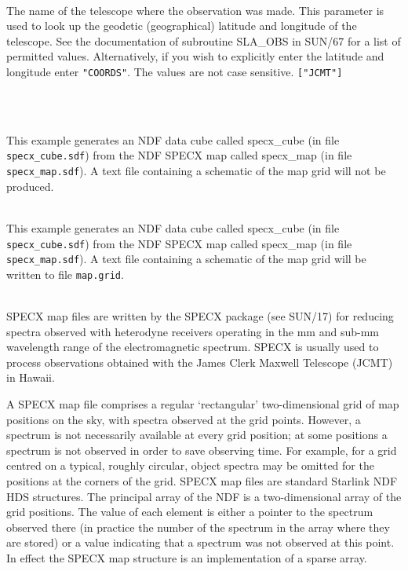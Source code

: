 \documentclass[twoside,11pt]{article}
\newcommand{\htmladdnormallink}[2]{#1}
\newcommand{\htmlref}[2]{#1}
\newcommand{\xref}[3]{#1}
\newlength{\sstexampleslength}
\newcommand{\sstexamples}[1]{
   \goodbreak
   \item[Examples:] \mbox{} \\
   \vspace{-3.5ex}
   \begin{description}
      #1
   \end{description}
}
\newcommand{\sstsubsection}[1]{ \item[{#1}] \mbox{} \\}
\newcommand{\sstexamplesubsection}[2]{\sloppy
\item[\parbox{\sstexampleslength}{\ssttt #1}] \mbox{} \vspace{0.5ex}
\\ #2 \vspace{1.0ex}}
\newcommand{\sstdiytopic}[2]{\goodbreak \item[{\hspace{-0.35em}#1\hspace{-0.35em}:}] \mbox{} \\[1.3ex] #2}
\newcommand{\sstexamples}[1]{
   \item[\vspace{0.35ex}\htmlref{Examples:\vspace{-0.5ex}}{app_example}]
      \begin{description}
         #1
      \end{description}
      \\
   }
\newcommand{\sstsubsection}[1]{\item[{#1}]}
\newcommand{\sstexamplesubsection}[2]{
   \vspace{-1.0ex} \item[{\ssttt #1}] #2 \vspace{0.2ex}}
\newcommand{\sstdiytopic}[2]{\\ \item[{#1}:]
      \begin{description}
         #2
      \end{description}
   }
\begin{document}
{{{      }
      \sstsubsection{
         TELESCOPE  =  LITERAL (Read)
      }{
         The name of the telescope where the observation was made.
         This parameter is used to look up the geodetic (geographical)
         latitude and longitude of the telescope.  See the documentation
         of subroutine SLA\_OBS in 
         \xref{SUN/67}{sun67}{} for a list of permitted values.
         Alternatively, if you wish to explicitly enter the latitude and
         longitude enter \texttt{"COORDS"}.  The values are not case sensitive.
         \texttt{["JCMT"]}
      }
   }
   \sstexamples{
      \sstexamplesubsection{
         specx2ndf  specx\_map  specx\_cube
      }{
         This example generates an NDF data cube called specx\_cube
         (in file \texttt{specx\_cube.sdf}) from the NDF SPECX map called
         specx\_map (in file \texttt{specx\_map.sdf}).  A text file
         containing a schematic of the map grid will not be produced.
      }
      \sstexamplesubsection{
         specx2ndf  specx\_map  specx\_cube  gridfile=map.grid
      }{
         This example generates an NDF data cube called specx\_cube
         (in file \texttt{specx\_cube.sdf}) from the NDF SPECX map called
         specx\_map (in file \texttt{specx\_map.sdf}).  A text file
         containing a schematic of the map grid will be written to file
         \texttt{map.grid}.
      }
   }
   \sstdiytopic{
      Input and output map formats
   }{
      SPECX map files are written by the SPECX package (see 
      \xref{SUN/17}{sun17}{}) for
      reducing spectra observed with heterodyne receivers operating in
      the mm and sub-mm wavelength range of the electromagnetic
      spectrum.  SPECX is usually used to process observations obtained
      with the \htmladdnormallink{James Clerk Maxwell
      Telescope}{http://www.jach.hawaii.edu/JCMT/index.html} (JCMT) in
      Hawaii.

      A SPECX map file comprises a regular `rectangular' two-dimensional
      grid of map positions on the sky, with spectra observed at the grid
      points.  However, a spectrum is not necessarily available at every
      grid position; at some positions a spectrum is not observed in
      order to save observing time.  For example, for a grid centred on
      a typical, roughly circular, object spectra may be omitted for the
      positions at the corners of the grid.  SPECX map files are standard
      Starlink NDF HDS structures.  The principal array of the NDF is a
      two-dimensional array of the grid positions.  The value of each
      element is either a pointer to the spectrum observed there (in
      practice the number of the spectrum in the array where they are
      stored) or a value indicating that a spectrum was not observed at
      this point.  In effect the SPECX map structure is an implementation
      of a sparse array.

}}
\end{document}
